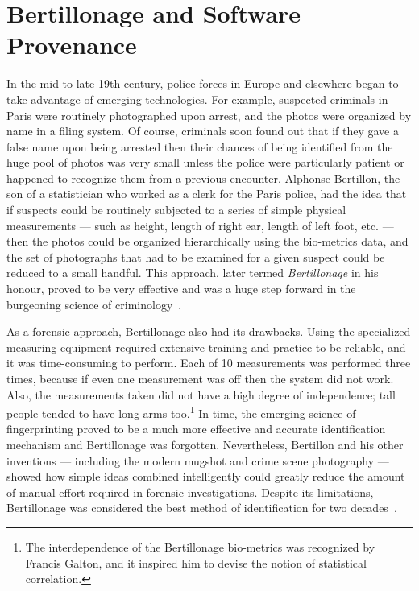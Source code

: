 
\section{Bertillonage and Software Provenance{\label{sec:bertillonage}}}

In the mid to late 19th century, police forces in Europe and elsewhere
began to take advantage of emerging technologies.  For example,
suspected criminals in Paris were routinely photographed upon arrest, and
the photos were organized by name in a filing system.  Of course, criminals
soon found out that if they gave a false name upon being arrested then
their chances of being identified from the huge pool of photos was very
small unless the police were particularly patient or happened to recognize
them from a previous encounter.  Alphonse Bertillon, the son of a
statistician who worked as a clerk for the Paris police, had the idea that
if suspects could be routinely subjected to a series of simple physical
measurements --- such as height, length of right ear, length of left foot,
etc. --- then the photos could be organized hierarchically using the
bio-metrics data, and the set of photographs that had to be examined for a
given suspect could be reduced to a small handful.
This approach, later termed \emph{Bertillonage} in his honour, proved to be
very effective and was a huge step forward in the burgeoning science of
criminology~\cite{encyForensic2000}.

As a forensic approach, Bertillonage also had its drawbacks.  Using the
specialized measuring equipment required extensive training and practice to
be reliable, and it was time-consuming to perform.  Each of 10 measurements
was performed three times, because if even one measurement was off then the
system did not work.  Also, the measurements taken did not have a high
degree of independence; tall people tended to have long arms
too.\footnote{The interdependence of the Bertillonage bio-metrics was
recognized by Francis Galton, and it inspired him to devise the notion of
statistical correlation.} In time, the emerging science of fingerprinting
proved to be a much more effective and accurate identification mechanism
and Bertillonage was forgotten.  Nevertheless, Bertillon and his other
inventions --- including the modern mugshot and crime scene photography ---
showed how simple ideas combined intelligently could greatly reduce the
amount of manual effort required in forensic investigations. Despite its
limitations, Bertillonage was considered the best method of identification
for two decades~\cite{forensic2006}.

